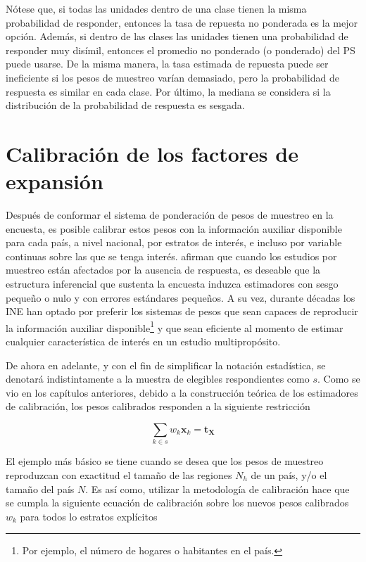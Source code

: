 \documentclass[
  12pt,
  spanish,
]{book}
\begin{document}
Nótese que, si todas las unidades dentro de una clase tienen la misma probabilidad de responder, entonces la tasa de repuesta no ponderada es la mejor opción. Además, si dentro de las clases las unidades tienen una probabilidad de responder muy disímil, entonces el promedio no ponderado (o ponderado) del PS puede usarse. De la misma manera, la tasa estimada de repuesta puede ser ineficiente si los pesos de muestreo varían demasiado, pero la probabilidad de respuesta es similar en cada clase. Por último, la mediana se considera si la distribución de la probabilidad de respuesta es sesgada.

\hypertarget{calibraciuxf3n-de-los-factores-de-expansiuxf3n}{%
\section{Calibración de los factores de expansión}\label{calibraciuxf3n-de-los-factores-de-expansiuxf3n}}

Después de conformar el sistema de ponderación de pesos de muestreo en la encuesta, es posible calibrar estos pesos con la información auxiliar disponible para cada país, a nivel nacional, por estratos de interés, e incluso por variable continuas sobre las que se tenga interés. \citet{Sarndal_Lundstrom_2006} afirman que cuando los estudios por muestreo están afectados por la ausencia de respuesta, es deseable que la estructura inferencial que sustenta la encuesta induzca estimadores con sesgo pequeño o nulo y con errores estándares pequeños. A su vez, durante décadas los INE han optado por preferir los sistemas de pesos que sean capaces de reproducir la información auxiliar disponible\footnote{Por ejemplo, el número de hogares o habitantes en el país.} y que sean eficiente al momento de estimar cualquier característica de interés en un estudio multipropósito.

De ahora en adelante, y con el fin de simplificar la notación estadística, se denotará indistintamente a la muestra de elegibles respondientes como \(s\). Como se vio en los capítulos anteriores, debido a la construcción teórica de los estimadores de calibración, los pesos calibrados responden a la siguiente restricción

\[
\sum_{k\in s}w_k\mathbf{x}_k = \mathbf{t_X}
\]

El ejemplo más básico se tiene cuando se desea que los pesos de muestreo reproduzcan con exactitud el tamaño de las regiones \(N_h\) de un país, y/o el tamaño del país \(N\). Es así como, utilizar la metodología de calibración \citep{Deville_Sarndal_1992} hace que se cumpla la siguiente ecuación de calibración sobre los nuevos pesos calibrados \(w_k\) para todos lo estratos explícitos
\end{document}
